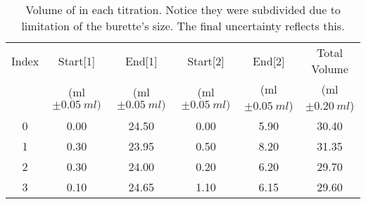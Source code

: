 \begin{table} [h] \centering
\begin{tabular}{c c c c c c}
Index&	Start[1]& End[1] &	Start[2]&	End[2]&	Total Volume \\
 & (ml $\pm \SI{0.05}{ml)}$& (ml $\pm \SI{0.05}{ml})$& (ml $\pm \SI{0.05}{ml})$& (ml $\pm \SI{0.05}{ml}$) & (ml $\pm \SI{0.20}{ml}$)\\ \hline
0&	0.00&	24.50&	0.00&	5.90&	30.40\\
1&	0.30&	23.95&	0.50&	8.20&	31.35\\
2&	0.30&	24.00&	0.20&	6.20&	29.70\\
3&	0.10&	24.65&	1.10&	6.15&	29.60\\

\end{tabular}
\caption{Volume of  in each titration. Notice they were subdivided due to limitation of the burette's size. The final uncertainty reflects this.}
\end{table}